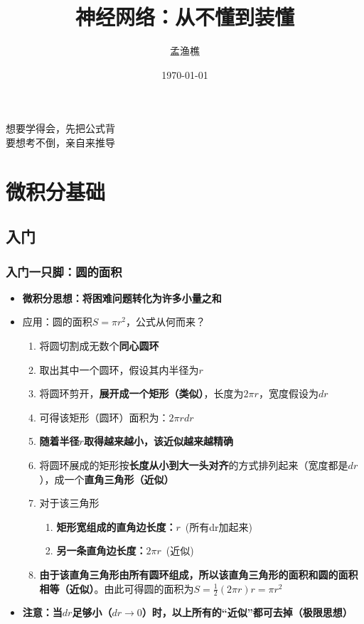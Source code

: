 \documentclass[UTF8]{ctexart}
\title{神经网络：从不懂到装懂}
\author{孟渔樵}
\date{\today}
\begin{document}
\maketitle
\begin{center}
想要学得会，先把公式背 \\
要想考不倒，亲自来推导 \\
\end{center}

\newpage
\tableofcontents

\newpage
\section{微积分基础}
\subsection{入门}
\subsubsection{入门一只脚：圆的面积}
\begin{itemize}
	\item {\bfseries 微积分思想：将困难问题转化为许多小量之和}
	\item 应用：圆的面积$S = \pi r^2$，公式从何而来？ \begin{enumerate}
		\item 将圆切割成无数个{\bfseries 同心圆环}
		\item 取出其中一个圆环，假设其内半径为$r$
		\item 将圆环剪开，{\bfseries 展开成一个矩形（类似）}，长度为$2\pi r$，宽度假设为$dr$
		\item 可得该矩形（圆环）面积为：$2\pi rdr$
		\item {\bfseries 随着半径$r$取得越来越小，该近似越来越精确}
		\item 将圆环展成的矩形按{\bfseries 长度从小到大一头对齐}的方式排列起来（宽度都是$dr$），成一个{\bfseries 直角三角形（近似）}
		\item 对于该三角形\begin{enumerate}
			\item {\bfseries 矩形宽组成的直角边长度：}$r$\ (所有dr加起来)
			\item {\bfseries 另一条直角边长度：}$2\pi r$\ (近似)
		\end{enumerate}
		\item {\bfseries 由于该直角三角形由所有圆环组成，所以该直角三角形的面积和圆的面积相等（近似）}。由此可得圆的面积为$S=\frac{1}{2}(2\pi r) r = \pi r^2$
	\end{enumerate}
	\item {\bfseries 注意：当$dr$足够小（$dr\to0$）时，以上所有的“近似”都可去掉（极限思想）}
\end{itemize}
\end{document}
